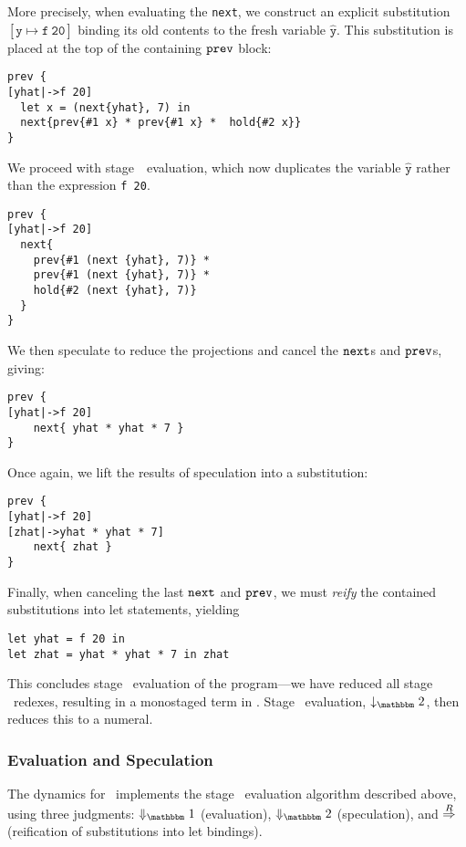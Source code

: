 More precisely, when evaluating the \verb|next|, we construct an explicit
substitution $\mathtt{[\hat y\mapsto f~20]}$ binding its old contents to the
fresh variable $\mathtt{\hat y}$. This substitution is placed at the top of the
containing ${\tt prev}$ block:
\begin{lstlisting} 
prev {
[yhat|->f 20]
  let x = (next{yhat}, 7) in
  next{prev{#1 x} * prev{#1 x} *  hold{#2 x}}
}
\end{lstlisting}
We proceed with stage~\bbone\ evaluation, which now duplicates the variable
$\mathtt{\hat y}$ rather than the expression \verb|f 20|.
\begin{lstlisting} 
prev {
[yhat|->f 20]
  next{
    prev{#1 (next {yhat}, 7)} * 
    prev{#1 (next {yhat}, 7)} *
    hold{#2 (next {yhat}, 7)}
  }
}
\end{lstlisting}
We then speculate to reduce the projections and cancel the ${\tt next}$s and ${\tt prev}$s, giving:
\begin{lstlisting} 
prev {
[yhat|->f 20]
    next{ yhat * yhat * 7 }
}
\end{lstlisting}
Once again, we lift the results of speculation into a substitution:
\begin{lstlisting} 
prev {
[yhat|->f 20]
[zhat|->yhat * yhat * 7]
    next{ zhat }
}
\end{lstlisting}
Finally, when canceling the last ${\tt next}$ and ${\tt prev}$, we must {\em reify} the contained substitutions into let statements, yielding
\begin{lstlisting} 
let yhat = f 20 in
let zhat = yhat * yhat * 7 in zhat
\end{lstlisting}

This concludes stage \bbone\ evaluation of the program---we have reduced all
stage \bbone\ redexes, resulting in a monostaged term in \langTwo. Stage \bbtwo\
evaluation, $\tworedsym$, then reduces this to a numeral.

\subsubsection{Evaluation and Speculation}
\label{ssec:dynamics}



The dynamics for \lang\ implements the stage \bbone\ evaluation algorithm
described above, using three judgments: $\redonesym$ (evaluation), $\redtwosym$
(speculation), and $\overset{R}\Rightarrow$ (reification of substitutions into let
bindings).

